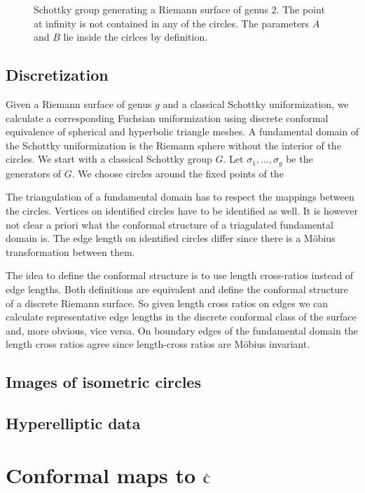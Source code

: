 \documentclass[Thesis.tex]{subfiles}
\begin{document}
\begin{figure}
	\centering
	\scalebox{1.0}{}
	\caption{Schottky group generating a Riemann surface of genus $2$. The point at infinity is not contained in 
any of the circles. The parameters $A$ and $B$ lie inside the cirlces by definition.}
	\label{fig:schottky_group}
\end{figure}



\subsection{Discretization}
Given a Riemann surface of genus $g$ and a classical Schottky uniformization, we calculate a corresponding 
Fuchsian uniformization using discrete conformal equivalence of spherical and hyperbolic triangle meshes.
A fundamental domain of the Schottky uniformization is the Riemann sphere without the interior of the circles.
We start with a classical Schottky group $G$. Let $\sigma_1,\ldots,\sigma_g$ be the generators of $G$. We choose circles around the fixed points of the

The triangulation of a fundamental domain has to respect the mappings between the circles. Vertices on identified 
circles have to be identified as well. It is however not clear a priori what the conformal structure of a triagulated 
fundamental domain is. The edge length on identified circles differ since there is a M{\" o}bius transformation 
between them. 

The idea to define the conformal structure is to use length cross-ratios instead of edge lengths. Both definitions are equivalent and define the conformal structure of a discrete Riemann surface. So given length cross ratios on edges we can calculate representative edge lengths in the discrete conformal class of the surface and, more obvious, vice versa. On boundary edges of the fundamental domain the length cross ratios agree since length-cross ratios are M{\" o}bius invariant.




\subsection{Images of isometric circles}
\subsection{Hyperelliptic data}

\section{Conformal maps to $\hat{\mathbb C}$}
\end{document}
